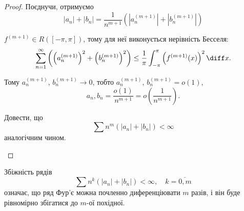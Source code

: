 \begin{proof}
    Поєднучи, отримуємо
    \begin{equation}
        |a_n| + |b_n| = \frac{1}{n^{m + 1}} \left( \left|a_n^{(m + 1)}\right| + \left|b_n^{(m + 1)}\right| \right)
    \end{equation}

    $f^{(m + 1)} \in R([-\pi, \pi])$, тому для неї виконується нерівність Бесселя:
    \begin{equation}
        \sum_{n = 1}^\infty \left( \left( a_n^{(m + 1)} \right)^2 + \left( b_n^{(m + 1)} \right)^2 \right) \le \frac{1}{\pi} \int_{-\pi}^\pi \left( f^{(m + 1)}(x) \right)^2 \diff x.
    \end{equation}

    Тому $a_n^{(m + 1)}$, $b_n^{(m + 1)} \to 0$, тобто $a_n^{(m + 1)}$, $b_n^{(m + 1)} = o(1)$,
    \begin{equation}
        a_n, b_n = \frac{o(1)}{n^{m + 1}} = o \left( \frac{1}{n^{m + 1}} \right).
    \end{equation}

    \begin{exercise}
        Довести, що
        \begin{equation}
            \sum n^m \left( |a_n| + |b_n| \right) < \infty
        \end{equation}
        аналогічним чином.
    \end{exercise}
\end{proof}

\begin{remark}
    Збіжність рядів
    \begin{equation}
        \sum n^k \left( |a_n| + |b_n| \right) < \infty, \quad k = \overline{0, m}
    \end{equation}
    означає, що ряд Фур'є можна почленно диференціювати $m$ разів, і він буде рівномірно збігатися до $m$-ої похідної.
\end{remark}

